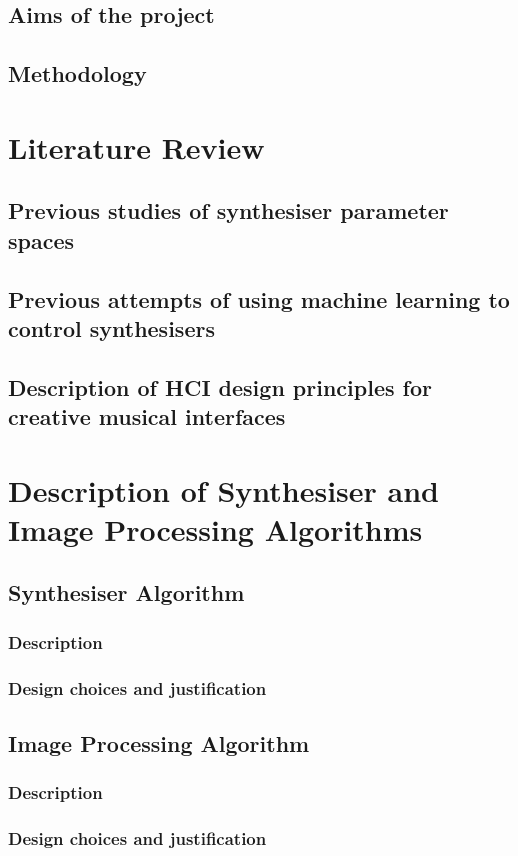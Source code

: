 \documentclass[11pt, oneside]{report}   	%
\begin{document}
\section{Aims of the project}

\section{Methodology}


\chapter{Literature Review}
\section{Previous studies of synthesiser parameter spaces}
\section{Previous attempts of using machine learning to control synthesisers}
\section{Description of HCI design principles for creative musical interfaces}

\chapter{Description of Synthesiser and Image Processing Algorithms}
\section{Synthesiser Algorithm}
\subsection{Description}
\subsection{Design choices and justification}
\section{Image Processing Algorithm}
\subsection{Description}
\subsection{Design choices and justification}
\end{document}
